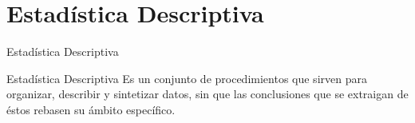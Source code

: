 \documentclass[11pt]{beamer}
\begin{document}
    \begin{frame}

    \end{frame}

  \section{Estadística Descriptiva}


    \begin{frame}{Estadística Descriptiva}
      \begin{block}{Estadística Descriptiva}
          Es un conjunto de procedimientos que sirven para organizar, describir y sintetizar datos, sin que las conclusiones que se extraigan de \'estos rebasen su \'ambito     específico.
      \end{block}
    \end{frame}
\end{document}
